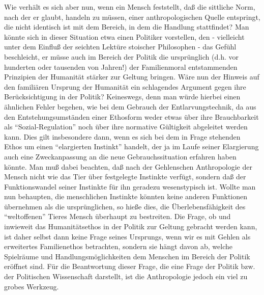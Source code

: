 \documentclass[12pt,a4paper]{article}
\begin{document}
Wie verhält es sich aber nun, wenn ein Mensch feststellt, daß die
sittliche Norm, nach der er glaubt, handeln zu müssen, einer
anthropologischen Quelle entspringt, die nicht identisch ist mit dem
Bereich, in dem die Handlung stattfindet? Man könnte sich in dieser
Situation etwa einen Politiker vorstellen, den - vielleicht unter dem
Einfluß der seichten Lektüre stoischer Philosophen - das Gefühl
beschleicht, er müsse auch im Bereich der Politik die ursprünglich (d.h.
vor hunderten oder tausenden von Jahren!)  der Familienmoral
entstammenden Prinzipien der Humanität stärker zur Geltung bringen. Wäre
nun der Hinweis auf den familiären Ursprung der Humanität ein
schlagendes Argument gegen ihre Berücksichtigung in der Politik?
Keineswegs, denn man würde hierbei einen ähnlichen Fehler begehen, wie
bei dem Gebrauch der Entlarvungstechnik, da aus den Entstehungsumständen
einer Ethosform weder etwas über ihre Brauchbarkeit als
"`Sozial-Regulation"' noch über ihre normative Gültigkeit abgeleitet
werden kann. Dies gilt insbesondere dann, wenn es sich bei dem in Frage
stehenden Ethos um einen "`elargierten Instinkt"' handelt, der ja im
Laufe seiner Elargierung auch eine Zweckanpassung an die neue
Gebrauchssituation erfahren haben könnte. Man muß dabei beachten, daß
nach der Gehlenschen Anthropologie der Mensch nicht wie das Tier über
festgelegte Instinkte verfügt, sondern daß der Funktionswandel seiner
Instinkte für ihn geradezu wesenstypisch ist. Wollte man nun behaupten,
die menschlichen Instinkte könnten keine anderen Funktionen übernehmen
als die ursprünglichen, so hieße dies, die Überlebensfähigkeit des
"`weltoffenen"' Tieres Mensch überhaupt zu bestreiten. Die Frage, ob und
inwieweit das Humanitätsethos in der Politik zur Geltung gebracht werden
kann, ist daher selbst dann keine Frage seines Ursprungs, wenn wir es
mit Gehlen als erweitertes Familienethos betrachten, sondern sie hängt
davon ab, welche Spielräume und Handlungsmöglichkeiten dem Menschen im
Bereich der Politik eröffnet sind. Für die Beantwortung dieser Frage,
die eine Frage der Politik bzw. der Politischen Wissenschaft darstellt, ist
die Anthropologie jedoch ein viel zu grobes Werkzeug.
\end{document}

